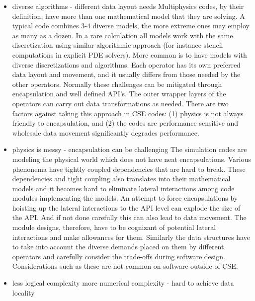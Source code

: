 \begin{itemize}
\item diverse algorithms - different data layout needs
Multiphysics codes, by their definition, have more than one
mathematical model that they are solving. A typical code combines 3-4
diverse models, the more extreme ones may employ as many as a
dozen. In a rare calculation all models work with the same
discretization using similar algorithmic approach (for instance
stencil computations in explicit PDE solvers). More common is to have
models with diverse discretizations and algorithms. Each operator has
its own preferred data layout and  movement, and it usually differs
from those needed by the other operators.  Normally these challenges
can be mitigated through encapsulation and well defined API's. The outer
wrapper layers of the operators can carry out data transformations as
needed. There are two factors against taking this approach in CSE
codes: (1) physics is not always
friendly to encapsulation, and (2) the codes are performance sensitive
and wholesale data movement significantly degrades performance.

\item physics is messy - encapsulation can be challenging
The simulation codes are modeling the physical world which does not
have neat encapsulations. Various phenonema have tightly coupled
dependencies that are hard to break. These dependencies and tight
coupling also translates into their mathematical models and it becomes
hard to eliminate lateral interactions among code modules implementing
the models. An attempt to force encapsulations by hoisting up the
lateral interactions to the API level can explode the size of the
API. And if not done carefully this can also lead to data
movement. The module designs, therefore, have to be cognizant of
potential lateral interactions and make allowances for them.
Similarly the data structures have to take into account the diverse
demands placed on them by different operators and carefully consider
the trade-offs during software design. Considerations such as these
are not common on software outside of CSE.  

\item less logical complexity more numerical complexity - hard to achieve data locality 


\end{itemize}
